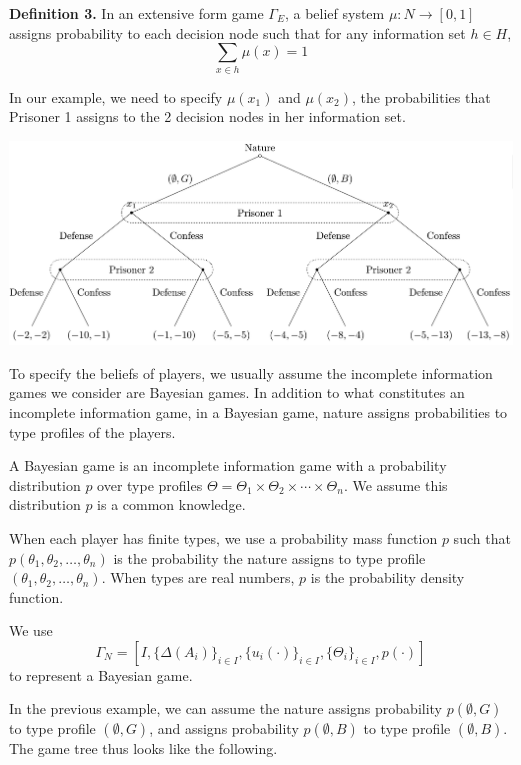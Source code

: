 \documentclass[12pt, oneside]{article}
\begin{document}
\textbf{Definition 3.} In an extensive form game \( \Gamma_E \), a belief system \( \mu : N \to [0,1] \) assigns probability to each decision node such that for any information set \( h \in H \),
\[
\sum_{x \in h} \mu(x) = 1
\]

In our example, we need to specify \( \mu(x_1) \) and \( \mu(x_2) \), the probabilities that Prisoner 1 assigns to the 2 decision nodes in her information set.

\includegraphics{Figure/incom_tree_bey.png}

To specify the beliefs of players, we usually assume the incomplete information games we consider are Bayesian games. In addition to what constitutes an incomplete information game, in a Bayesian game, nature assigns probabilities to type profiles of the players.

A Bayesian game is an incomplete information game with a probability distribution \( p \) over type profiles \( \Theta = \Theta_1 \times \Theta_2 \times \cdots \times \Theta_n \). We assume this distribution \( p \) is a common knowledge.

When each player has finite types, we use a probability mass function \( p \) such that \( p(\theta_1, \theta_2, \dots, \theta_n) \) is the probability the nature assigns to type profile \( (\theta_1, \theta_2, \dots, \theta_n) \). When types are real numbers, \( p \) is the probability density function.

We use 
\[
\Gamma_N = [I, \{\Delta(A_i)\}_{i\in I}, \{u_i(\cdot)\}_{i\in I}, \{\Theta_i\}_{i\in I}, p(\cdot)]
\]
to represent a Bayesian game.

In the previous example, we can assume the nature assigns probability \( p(\emptyset, G) \) to type profile \( (\emptyset, G) \), and assigns probability \( p(\emptyset, B) \) to type profile \( (\emptyset, B) \). The game tree thus looks like the following.
\end{document}
